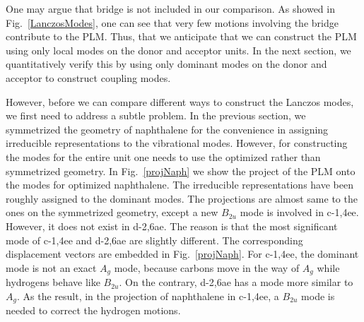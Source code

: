 
One may argue that bridge is not included in our comparison.
As showed in Fig.~\ref{LanczosModes}, one can see that very few motions involving the bridge contribute to the PLM.
Thus, that we anticipate that we can construct the PLM using only local modes on the donor and acceptor units.
 In the next section, we  quantitatively verify this by using only
dominant modes on the  donor and acceptor to construct coupling modes.

However, before we can compare different ways to construct the Lanczos modes, we first need to
address a  subtle problem.   In the previous section, we symmetrized the geometry of naphthalene
for the convenience in assigning  irreducible representations to the vibrational modes.
However, for constructing the modes
for the entire unit one needs to use the optimized rather than symmetrized geometry.
In Fig.~\ref{projNaph}  we show the project of the PLM onto the modes for optimized
naphthalene.  The irreducible representations have been roughly assigned to the dominant modes.
The projections are
almost same to the ones on the symmetrized geometry, except a new $B_{2u}$ mode is involved
in c-1,4ee. However, it does not exist in d-2,6ae. The reason is that the most significant
mode of c-1,4ee and d-2,6ae are slightly different. The corresponding displacement vectors are
embedded in Fig.~\ref{projNaph}. For c-1,4ee, the dominant mode is not an exact $A_g$ mode, because
carbons move in the way of $A_g$ while
hydrogens behave like $B_{2u}$. On the contrary, d-2,6ae has
a mode more similar to $A_g$.
As the result, in the projection of naphthalene in c-1,4ee, a  $B_{2u}$
mode is needed to correct the hydrogen motions.

